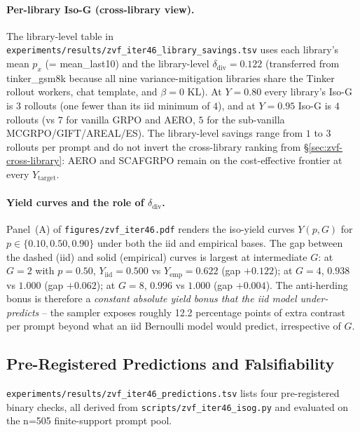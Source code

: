 \documentclass{article}
\begin{document}
\paragraph{Per-library Iso-G (cross-library view).}
The library-level table in
\texttt{experiments/results/zvf_iter46_library_savings.tsv} uses each
library's mean $p_x$ (= mean\_last10) and the library-level
$\delta_{\mathrm{div}}{=}0.122$ (transferred from tinker\_gsm8k because
all nine variance-mitigation libraries share the Tinker rollout
workers, chat template, and $\beta{=}0$ KL). At $Y{=}0.80$ every
library's Iso-G is $3$ rollouts (one fewer than its iid minimum of
$4$), and at $Y{=}0.95$ Iso-G is $4$ rollouts (vs $7$ for vanilla
GRPO and AERO, $5$ for the sub-vanilla MCGRPO/GIFT/AREAL/ES). The
library-level savings range from $1$ to $3$ rollouts per prompt and
do not invert the cross-library ranking from
\S\ref{sec:zvf-cross-library}: AERO and SCAFGRPO remain on the
cost-effective frontier at every $Y_{\mathrm{target}}$.

\paragraph{Yield curves and the role of $\delta_{\mathrm{div}}$.}
Panel~(A) of \texttt{figures/zvf_iter46.pdf} renders the iso-yield
curves $Y(p, G)$ for $p \in \{0.10, 0.50, 0.90\}$ under both
the iid and empirical bases. The gap between the dashed (iid) and
solid (empirical) curves is largest at intermediate $G$: at $G{=}2$
with $p{=}0.50$, $Y_{\mathrm{iid}}{=}0.500$ vs $Y_{\mathrm{emp}}{=}0.622$
(gap $+0.122$); at $G{=}4$, $0.938$ vs $1.000$ (gap $+0.062$);
at $G{=}8$, $0.996$ vs $1.000$ (gap $+0.004$). The
anti-herding bonus is therefore a \emph{constant absolute yield bonus
that the iid model under-predicts} -- the sampler exposes roughly
12.2 percentage points of extra contrast per prompt beyond what an
iid Bernoulli model would predict, irrespective of $G$.

\subsection{Pre-Registered Predictions and Falsifiability}
\label{sec:zvf-isog-predictions}
\texttt{experiments/results/zvf_iter46_predictions.tsv} lists four
pre-registered binary checks, all derived from
\texttt{scripts/zvf_iter46_isog.py} and evaluated on the
n=505 finite-support prompt pool.
\end{document}
